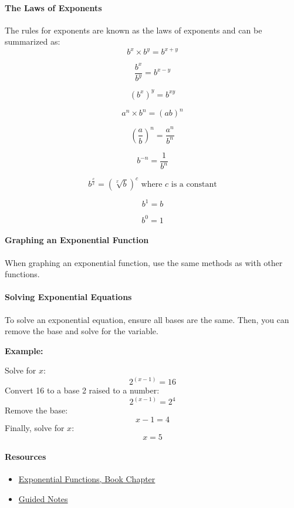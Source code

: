\paragraph{The Laws of Exponents}

The rules for exponents are known as the laws of exponents and can be summarized as:
$$
b^x \times b^y = b^{x+y}
$$

$$
\frac{b^x}{b^y} = b^{x-y}
$$

$$
\left(b^x\right)^y = b^{xy}
$$

$$
a^n \times b^n = (ab)^n
$$

$$
\left(\frac{a}{b}\right)^n = \frac{a^n}{b^n}
$$

$$
b^{-n} = \frac{1}{b^n}
$$

$$
b^{\frac{c}{x}} = \left(\sqrt[x]{b}\right)^c \text{ where } c \text{ is a constant}
$$

$$
b^1 = b
$$

$$
b^0 = 1
$$
\paragraph{Graphing an Exponential Function}

When graphing an exponential function, use the same methods as with other functions. 


\paragraph{Solving Exponential Equations}

To solve an exponential equation, ensure all bases are the same. Then, you can remove the base and solve for the variable. 

\textbf{Example:}

Solve for $x$:
$$
2^{(x-1)} = 16
$$
Convert 16 to a base 2 raised to a number:
$$
2^{(x-1)} = 2^4
$$
Remove the base:
$$
x - 1 = 4
$$
Finally, solve for $x$:
$$
x = 5
$$
\paragraph{Resources}

\begin{itemize}
    \item \href{https://mathresearch.utsa.edu/wikiFiles/MAT1053/Exponential\%20Functions/MAT1053_M5.1Exponential_Functions.pdf}{Exponential Functions, Book Chapter}
    \item \href{https://mathresearch.utsa.edu/wikiFiles/MAT1053/Exponential\%20Functions/MAT1053_M5.1Exponential_FunctionsGN.pdf}{Guided Notes}
\end{itemize}

